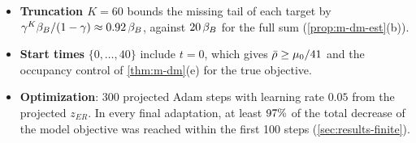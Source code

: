\begin{itemize}[nosep]
\item \textbf{Truncation $K=60$} bounds the missing tail of each target by $\gamma^K\beta_B/(1-\gamma)\approx\vn{const.gK_over}{0.92}\,\beta_B$, against $\vn{const.mass}{20}\,\beta_B$ for the full sum (\cref{prop:m-dm-est}(b)).
\item \textbf{Start times} $\{0,\dots,40\}$ include $t=0$, which gives $\bar\rho\ge\mu_0/\vn{const.n_starts}{41}$ and the occupancy control of \cref{thm:m-dm}(e) for the true objective.
\item \textbf{Optimization}: 300 projected Adam steps with learning rate $0.05$ from the projected $z_{ER}$. In every final adaptation, at least $\vn{s09.frac100}{97}\%$ of the total decrease of the model objective was reached within the first 100 steps (\cref{sec:results-finite}).
\end{itemize}
